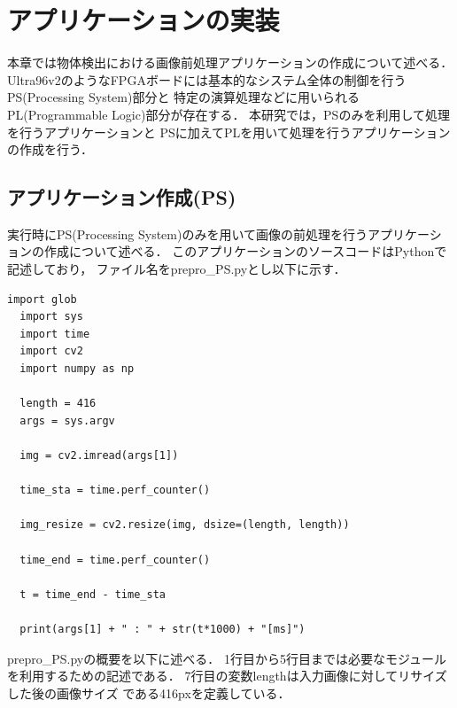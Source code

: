 \documentclass[11pt,a4j]{jreport}
\begin{document}
%
\chapter{アプリケーションの実装}
本章では物体検出における画像前処理アプリケーションの作成について述べる．
Ultra96v2のようなFPGAボードには基本的なシステム全体の制御を行うPS(Processing System)部分と
特定の演算処理などに用いられるPL(Programmable Logic)部分が存在する．
本研究では，PSのみを利用して処理を行うアプリケーションと
PSに加えてPLを用いて処理を行うアプリケーションの作成を行う．
\section{アプリケーション作成(PS)}
実行時にPS(Processing System)のみを用いて画像の前処理を行うアプリケーションの作成について述べる．
このアプリケーションのソースコードはPythonで記述しており，
ファイル名をprepro_PS.pyとし以下に示す．
\begin{lstlisting}[caption=prepro_PS.py]
  import glob
  import sys
  import time
  import cv2
  import numpy as np
  
  length = 416
  args = sys.argv

  img = cv2.imread(args[1])
  
  time_sta = time.perf_counter()

  img_resize = cv2.resize(img, dsize=(length, length))
  
  time_end = time.perf_counter()

  t = time_end - time_sta

  print(args[1] + " : " + str(t*1000) + "[ms]")
\end{lstlisting}
prepro_PS.pyの概要を以下に述べる．
1行目から5行目までは必要なモジュールを利用するための記述である．
7行目の変数lengthは入力画像に対してリサイズした後の画像サイズ
である416pxを定義している．
\end{document}
